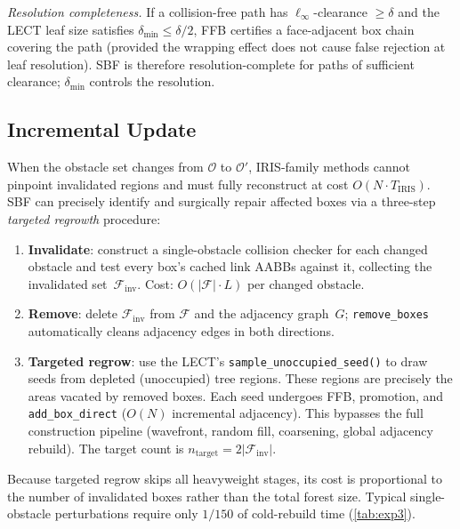 \documentclass[letterpaper, conference]{IEEEtran}
\newcommand{\calO}{\mathcal{O}}
\newcommand{\calF}{\mathcal{F}}
\begin{document}
\emph{Resolution completeness.}
If a collision-free path has $\ell_\infty$-clearance $\geq \delta$ and
the LECT leaf size satisfies $\delta_{\min} \leq \delta/2$, FFB
certifies a face-adjacent box chain covering the path (provided the
wrapping effect does not cause false rejection at leaf resolution).
SBF is therefore resolution-complete for paths of sufficient
clearance; $\delta_{\min}$ controls the resolution.

\subsection{Incremental Update}\label{sec:incremental}

When the obstacle set changes from $\calO$ to $\calO'$, IRIS-family methods
cannot pinpoint invalidated regions and must fully reconstruct at cost
$O(N \cdot T_\text{IRIS})$.
SBF can precisely identify and surgically repair affected boxes via
a three-step \emph{targeted regrowth} procedure:
\begin{enumerate}
\item \textbf{Invalidate}: construct a single-obstacle collision checker
  for each changed obstacle and test every box's cached link AABBs
  against it, collecting the invalidated set~$\calF_\text{inv}$.
  Cost: $O(|\calF| \cdot L)$ per changed obstacle.
\item \textbf{Remove}: delete $\calF_\text{inv}$ from $\calF$ and the
  adjacency graph~$G$; \texttt{remove\_boxes} automatically cleans
  adjacency edges in both directions.
\item \textbf{Targeted regrow}: use the LECT's
  \texttt{sample\_unoccupied\_seed()} to draw seeds from depleted
  (unoccupied) tree regions.
  These regions are precisely the areas vacated by removed boxes.
  Each seed undergoes FFB, promotion, and
  \texttt{add\_box\_direct} ($O(N)$ incremental adjacency).
  This bypasses the full construction pipeline (wavefront, random fill,
  coarsening, global adjacency rebuild).
  The target count is $n_\text{target} = 2|\calF_\text{inv}|$.
\end{enumerate}
Because targeted regrow skips all heavyweight stages, its cost is
proportional to the number of invalidated boxes rather than the total
forest size.
Typical single-obstacle perturbations require only $1/150$ of
cold-rebuild time (\cref{tab:exp3}).

\end{document}
